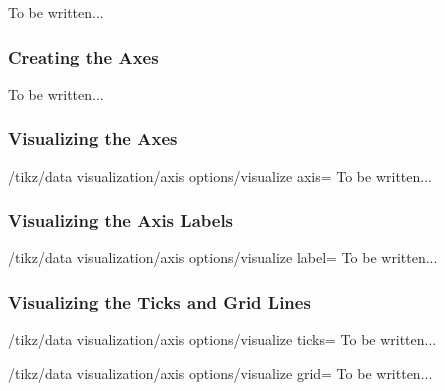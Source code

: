 To be written...

\subsubsection{Creating the Axes}

To be written...

\subsubsection{Visualizing the Axes}

\label{section-dv-visualize-axis}

\begin{key}{/tikz/data visualization/axis options/visualize axis=}
  To be written...    
\end{key}

\subsubsection{Visualizing the Axis Labels}

\label{section-dv-visualize-label}

\begin{key}{/tikz/data visualization/axis options/visualize label=}
  To be written...
\end{key}

\subsubsection{Visualizing the Ticks and Grid Lines}

\label{section-dv-visualize-ticks}
\label{section-dv-visualize-gridlines}

\begin{key}{/tikz/data visualization/axis options/visualize ticks=}
  To be written...
\end{key}

\begin{key}{/tikz/data visualization/axis options/visualize grid=}
  To be written...
\end{key}

